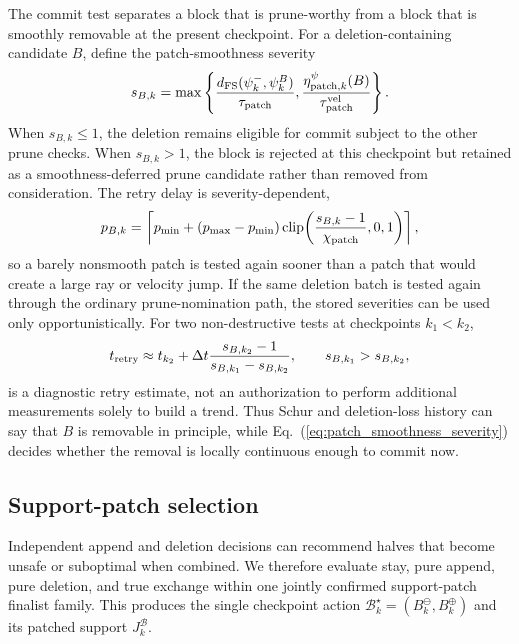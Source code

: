 \documentclass[
  reprint,
  amsmath,
  amssymb,
  aps,
  pra,
  nofootinbib,
  superscriptaddress,
  floatfix
]{revtex4-2}
\begin{document}
The commit test separates a block that is prune-worthy from a block that is smoothly removable at the present checkpoint.  For a deletion-containing candidate \(B\), define the patch-smoothness severity
\begin{equation}
s_{B,k}
=
\max\left\{
\frac{d_{\rm FS}(\psi_k^-,\psi_k^B)}{\tau_{\rm patch}},
\frac{\eta_{{\rm patch},k}^{\psi}(B)}{\tau_{\rm patch}^{\rm vel}}
\right\}.
\label{eq:patch_smoothness_severity}
\end{equation}
When \(s_{B,k}\le 1\), the deletion remains eligible for commit subject to the other prune checks.  When \(s_{B,k}>1\), the block is rejected at this checkpoint but retained as a smoothness-deferred prune candidate rather than removed from consideration.  The retry delay is severity-dependent,
\begin{equation}
p_{B,k}
=
\left\lceil
p_{\min}
+
(p_{\max}-p_{\min})
\operatorname{clip}\!\left(
\frac{s_{B,k}-1}{\chi_{\rm patch}},
0,1
\right)
\right\rceil ,
\label{eq:patch_smoothness_deferral}
\end{equation}
so a barely nonsmooth patch is tested again sooner than a patch that would create a large ray or velocity jump.  If the same deletion batch is tested again through the ordinary prune-nomination path, the stored severities can be used only opportunistically.  For two non-destructive tests at checkpoints \(k_1<k_2\),
\begin{equation}
t_{\rm retry}
\approx
t_{k_2}
+
\Delta t
\frac{s_{B,k_2}-1}{s_{B,k_1}-s_{B,k_2}},
\qquad
s_{B,k_1}>s_{B,k_2},
\label{eq:patch_smoothness_secant_retry}
\end{equation}
is a diagnostic retry estimate, not an authorization to perform additional measurements solely to build a trend.  Thus Schur and deletion-loss history can say that \(B\) is removable in principle, while Eq.~(\ref{eq:patch_smoothness_severity}) decides whether the removal is locally continuous enough to commit now.

\subsection{Support-patch selection}

Independent append and deletion decisions can recommend halves that become unsafe or suboptimal when combined.  We therefore evaluate stay, pure append, pure deletion, and true exchange within one jointly confirmed support-patch finalist family.  This produces the single checkpoint action $\mathcal B_k^\star=(B_k^{\ominus},B_k^{\oplus})$ and its patched support $J_k^{\mathcal B}$.
\end{document}
